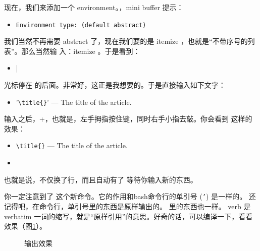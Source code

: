 现在，我们来添加一个 environment。，mini buffer 提示：

\begin{itemize}
\item[] \texttt{Environment type: (default abstract)}
\end{itemize}

我们当然不再需要 abstract 了，现在我们要的是 itemize ，也就是“不带序号的列表”。那么当然输
入：itemize 。于是看到：
\begin{codeblock}[.9]
\begin{latexcode}
  \begin{itemize}
  \item |
  \end{itemize}
\end{latexcode}
\end{codeblock}
光标停在 \ltx{\item} 的后面。非常好，这正是我想要的。于是直接输入如下文字：

\begin{itemize}
\item[] \ltx'\verb|\title{}|' --- The title of the article.
\end{itemize}

输入之后，\LKeyAlt{}+\LKeyEnter{}，也就是，左手拇指按住\LKeyAlt{}键，同时右手小指去敲\LKeyEnter{}。你会看到
这样的效果：
\begin{codeblock}[.9]
\begin{latexcode}
  \begin{itemize}
  \item \verb|\title{}| --- The title of the article.
  \item 
  \end{itemize}
\end{latexcode}
\end{codeblock}
也就是说，不仅换了行，而且自动有了 \ltx{\item}等待你输入新的东西。

你一定注意到了 \ltx{\verb||} 这个新命令。它的作用和bash命令行的单引号 (\texttt{'}) 是一样的。
还记得吧，在命令行，单引号里的东西是原样输出的。 \ltx{\verb||} 里的东西也一样。 verb 是
verbatim 一词的缩写，就是“原样引用”的意思。好奇的话，可以编译一下，看看效果（图\ref{fig:env}）。

\begin{figure}
  \centering
  \quad
  \caption{输出效果\label{fig:env}}
\end{figure}


